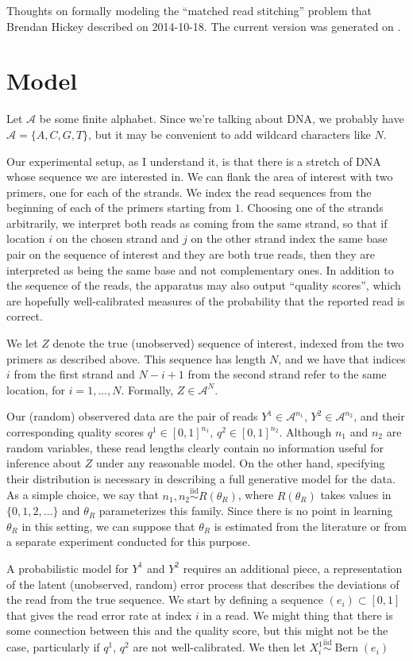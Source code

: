 \documentclass[10pt,letterpaper]{article}
\newcommand{\abc}{\mathcal{A}}
\DeclareMathOperator{\bern}{Bern}
\begin{document}
Thoughts on formally modeling the ``matched read stitching'' problem
that Brendan Hickey described on 2014-10-18. The current version was
generated on \fbox{\today}.

\section*{Model}

Let $\abc$ be some finite alphabet. Since we're talking about DNA, we
probably have $\abc = \{ A, C, G, T \}$, but it may be convenient to
add wildcard characters like $N$.

Our experimental setup, as I understand it, is that there is a stretch
of DNA whose sequence we are interested in. We can flank the area of
interest with two primers, one for each of the strands. We index the
read sequences from the beginning of each of the primers starting from
$1$. Choosing one of the strands arbitrarily, we interpret both reads
as coming from the same strand, so that if location $i$ on the chosen
strand and $j$ on the other strand index the same base pair on the
sequence of interest and they are both true reads, then they are
interpreted as being the same base and not complementary ones. In
addition to the sequence of the reads, the apparatus may also output
``quality scores'', which are hopefully well-calibrated measures of
the probability that the reported read is correct.

We let $Z$ denote the true (unobserved) sequence of interest, indexed
from the two primers as described above. This sequence has length $N$,
and we have that indices $i$ from the first strand and $N-i+1$ from the
second strand refer to the same location, for $i = 1, \ldots,
N$. Formally, $Z \in \abc^N$.

Our (random) observered data are the pair of reads $Y^1 \in
\abc^{n_1}$, $Y^2 \in \abc^{n_2}$, and their corresponding quality
scores $q^1 \in [0,1]^{n_1}$, $q^2 \in [0,1]^{n_2}$. Although $n_1$
and $n_2$ are random variables, these read lengths clearly
contain no information useful for inference about $Z$ under any
reasonable model. On the other hand, specifying their distribution is
necessary in describing a full generative model for the data. As a
simple choice, we say that $n_1, n_2 \overset{\text{iid}}{\sim}
R(\theta_R)$, where $R(\theta_R)$ takes values in $\{ 0, 1, 2, \ldots
\}$ and $\theta_R$ parameterizes this family. Since there is no point
in learning $\theta_R$ in this setting, we can suppose that $\theta_R$
is estimated from the literature or from a separate experiment
conducted for this purpose.

A probabilistic model for $Y^1$ and $Y^2$ requires an additional
piece, a representation of the latent (unobserved, random) error
process that describes the deviations of the read from the true
sequence. We start by defining a sequence $( e_i ) \subset [0,1]$ that
gives the read error rate at index $i$ in a read. We might thing that
there is some connection between this and the quality score, but this
might not be the case, particularly if $q^1$, $q^2$ are not
well-calibrated. We then let $X_i^1 \overset{\text{iid}}{\sim} \bern(e_i)$
\end{document}
